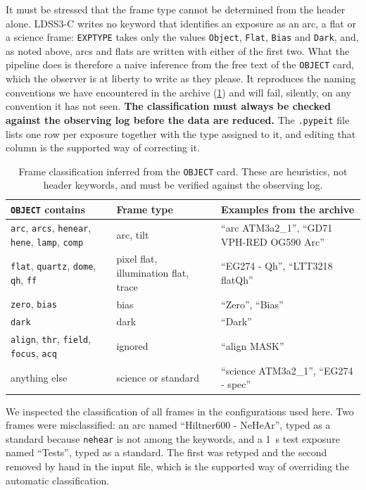 \documentclass[11pt,a4paper]{article}
\newcommand{\code}[1]{\texttt{#1}}
\begin{document}
It must be stressed that the frame type cannot be determined from the header
alone. LDSS3-C writes no keyword that identifies an exposure as an arc, a flat
or a science frame: \code{EXPTYPE} takes only the values \code{Object},
\code{Flat}, \code{Bias} and \code{Dark}, and, as noted above, arcs and flats
are written with either of the first two. What the pipeline does is therefore a
naive inference from the free text of the \code{OBJECT} card, which the observer
is at liberty to write as they please. It reproduces the naming conventions we
have encountered in the archive (\cref{tab:typing}) and will fail, silently, on
any convention it has not seen. \textbf{The classification must always be
checked against the observing log before the data are reduced.} The
\code{.pypeit} file lists one row per exposure together with the type assigned
to it, and editing that column is the supported way of correcting it.

\begin{table}[t]
  \centering\small
  \caption{Frame classification inferred from the \code{OBJECT} card. These are
  heuristics, not header keywords, and must be verified against the observing
  log.}
  \label{tab:typing}
  \begin{tabular}{lll}
    \toprule
    \code{OBJECT} contains & Frame type & Examples from the archive \\
    \midrule
    \code{arc}, \code{arcs}, \code{henear}, \code{hene}, \code{lamp}, \code{comp}
      & arc, tilt & ``arc ATM3a2\_1'', ``GD71 VPH-RED OG590 Arc'' \\
    \code{flat}, \code{quartz}, \code{dome}, \code{qh}, \code{ff}
      & pixel flat, illumination flat, trace & ``EG274 - Qh'', ``LTT3218 flatQh'' \\
    \code{zero}, \code{bias} & bias & ``Zero'', ``Bias'' \\
    \code{dark} & dark & ``Dark'' \\
    \code{align}, \code{thr}, \code{field}, \code{focus}, \code{acq} & ignored & ``align MASK'' \\
    anything else & science or standard & ``science ATM3a2\_1'', ``EG274 - spec'' \\
    \bottomrule
  \end{tabular}
\end{table}

We inspected the classification of all frames in the configurations used here.
Two frames were misclassified: an arc named ``Hiltner600 - NeHeAr'', typed as a
standard because \code{nehear} is not among the keywords, and a \SI{1}{\second}
test exposure named ``Tests'', typed as a standard. The first was retyped and
the second removed by hand in the input file, which is the supported way of
overriding the automatic classification.
\end{document}

